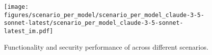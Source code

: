 
\begin{figure}[h]
    \centering
    \texttt{[image: figures/scenario\_per\_model/scenario\_per\_model\_claude-3-5-sonnet-latest/scenario\_per\_model\_claude-3-5-sonnet-latest\_im.pdf]}
    \caption{Functionality and security performance of \claudesonnet{} across different scenarios.}
    \label{fig:scenario_per_model_claude-3-5-sonnet-latest}
\end{figure}
